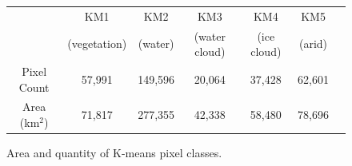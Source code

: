 \documentclass[12pt]{article}
\begin{document}
\begin{figure}[h!]
    \centering
    \begin{tabular}{c|cccccc}
        & KM1 & KM2 & KM3 & KM4 & KM5 \\
        & \footnotesize{(vegetation)} & \footnotesize{(water)} & \footnotesize{(water cloud)} & \footnotesize{(ice cloud)}& \footnotesize{(arid)} \\
        \hline
        Pixel Count & 57,991 & 149,596 & 20,064 & 37,428 & 62,601 \\
        Area (km$^2$) & 71,817 & 277,355 & 42,338 & 58,480 & 78,696 \\
    \end{tabular}
    \caption{Area and quantity of K-means pixel classes.}
    \label{km_areas}
\end{figure}

\clearpage

\begin{figure}[h!]
    \centering

    \begin{center}
    \end{center}

    \caption{}
    \label{km_results}
\end{figure}
\end{document}
